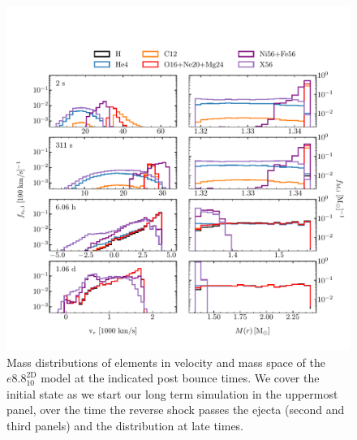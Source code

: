 \documentclass[fleqn,usenatbib]{mnras}
\begin{document}
\begin{figure}
 \centering
 \includegraphics[width=\textwidth,trim=0cm 0.6cm 0cm 1cm, clip]{pic/e8_2d_10_massDis_mvr_mas_4times_paper.pdf}
 \caption{Mass distributions of elements in velocity and mass space  of the $e8.8^{\mathrm{2D}}_{10}$ model at the indicated post bounce times. We cover the initial state as we start our long term simulation in the uppermost panel, over the time the reverse shock passes the ejecta (second and third panels) and the distribution at late times.}
 \label{fig:e8 massDis 4times}
\end{figure}

%
\end{document}

